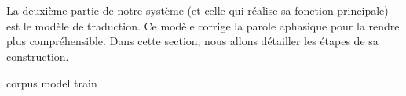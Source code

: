 \section{}

La deuxième partie de notre système (et celle qui réalise sa fonction principale) est le modèle de traduction.
Ce modèle corrige la parole aphasique pour la rendre plus compréhensible.
Dans cette section, nous allons détailler les étapes de sa construction.

{corpus}
{model}
{train}